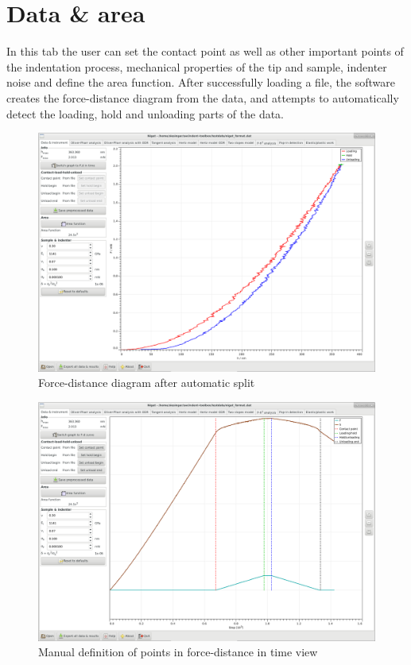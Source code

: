 \section{Data \& area}

In this tab the user can set the contact point as well as other important points of the indentation process, mechanical properties of the tip and sample, indenter noise and define the area function.
After successfully loading a file, the software creates the force-distance diagram from the data, and attempts to automatically detect the loading, hold and unloading parts of the data.

\begin{figure}[ht]
  \centering
  \includegraphics[width=\textwidth]{images/screen-fd}
  \caption{Force-distance diagram after automatic split}
\end{figure}

\begin{figure}[ht]
  \centering
  \includegraphics[width=\textwidth]{images/screen-fdtime}
  \caption{Manual definition of points in force-distance in time view}
\end{figure}

